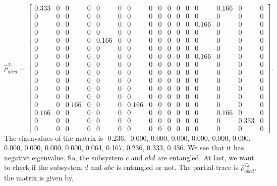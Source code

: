 \documentclass{scrartcl}
\begin{document}
\begin{equation*}
	\hat{\rho}^{T_c}_{abcd}= \left[\begin{array}{cccccccccccccccc}0.333 & 0 & 0 & 0 & 0 & 0 & 0 & 0 & 0 & 0 & 0 & 0 & 0 & 0.166 & 0 & 0\\0 & 0 & 0 & 0 & 0 & 0 & 0 & 0 & 0 & 0 & 0 & 0 & 0 & 0 & 0 & 0\\0 & 0 & 0 & 0 & 0 & 0 & 0 & 0 & 0 & 0 & 0 & 0 & 0.166 & 0 & 0 & 0\\0 & 0 & 0 & 0 & 0 & 0 & 0 & 0 & 0 & 0 & 0 & 0 & 0 & 0 & 0 & 0\\0 & 0 & 0 & 0 & 0.166 & 0 & 0 & 0 & 0 & 0 & 0 & 0 & 0 & 0 & 0 & 0\\0 & 0 & 0 & 0 & 0 & 0 & 0 & 0 & 0 & 0 & 0 & 0 & 0 & 0 & 0 & 0\\0 & 0 & 0 & 0 & 0 & 0 & 0 & 0 & 0 & 0 & 0 & 0 & 0.166 & 0 & 0 & 0\\0 & 0 & 0 & 0 & 0 & 0 & 0 & 0 & 0 & 0 & 0 & 0 & 0 & 0 & 0 & 0\\0 & 0 & 0 & 0 & 0 & 0 & 0 & 0 & 0 & 0 & 0 & 0 & 0 & 0 & 0 & 0\\0 & 0 & 0 & 0 & 0 & 0 & 0 & 0 & 0 & 0 & 0 & 0 & 0 & 0 & 0 & 0\\0 & 0 & 0 & 0 & 0 & 0 & 0 & 0 & 0 & 0 & 0 & 0 & 0 & 0 & 0 & 0\\0 & 0 & 0 & 0 & 0 & 0 & 0 & 0 & 0 & 0 & 0 & 0 & 0 & 0 & 0 & 0\\0 & 0 & 0.166 & 0 & 0 & 0 & 0.166 & 0 & 0 & 0 & 0 & 0 & 0 & 0 & 0 & 0\\0.166 & 0 & 0 & 0 & 0 & 0 & 0 & 0 & 0 & 0 & 0 & 0 & 0 & 0.166 & 0 & 0\\0 & 0 & 0 & 0 & 0 & 0 & 0 & 0 & 0 & 0 & 0 & 0 & 0 & 0 & 0.333 & 0\\0 & 0 & 0 & 0 & 0 & 0 & 0 & 0 & 0 & 0 & 0 & 0 & 0 & 0 & 0 & 0\end{array}\right]
	.
\end{equation*}
The eigenvalues of the matrix is -0.236, -0.000, 0.000, 0.000, 0.000, 0.000, 0.000, 0.000, 0.000, 0.000, 0.000, 0.064, 0.167, 0.236, 0.333, 0.436. We see that it has negative eigenvalue. So, the subsystem $c$ and $abd$ are entangled. At last, we want to check if the subsystem $d$ and $abc$ is entangled or not. The partial trace is $\hat{\rho}^{T_d}_{abcd}$, the matrix is given by,
\end{document}
